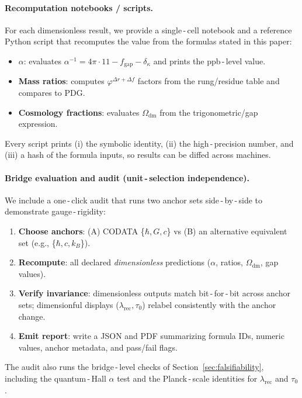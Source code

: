\documentclass[11pt]{article}
\newcommand{\lamrec}{\lambda_{\mathrm{rec}}}
\newcommand{\tauzero}{\tau_{0}}
\theoremstyle{remark}
\begin{document}
\paragraph{Recomputation notebooks / scripts.}
For each dimensionless result, we provide a single\,\mbox{-}\,cell notebook and a reference Python script that recomputes the value from the formulas stated in this paper:
\begin{itemize}
  \item \textbf{$\alpha$}: evaluates $\alpha^{-1}=4\pi\cdot 11 - f_{\mathrm{gap}} - \delta_{\kappa}$ and prints the ppb\,\mbox{-}\,level value.
  \item \textbf{Mass ratios}: computes $\varphi^{\Delta r + \Delta f}$ factors from the rung/residue table and compares to PDG.
  \item \textbf{Cosmology fractions}: evaluates $\Omega_{\mathrm{dm}}$ from the trigonometric/gap expression.
\end{itemize}
Every script prints (i) the symbolic identity, (ii) the high\,\mbox{-}\,precision number, and (iii) a hash of the formula inputs, so results can be diffed across machines.

\paragraph{Bridge evaluation and audit (unit\,\mbox{-}\,selection independence).}
We include a one\,\mbox{-}\,click audit that runs two anchor sets side\,\mbox{-}\,by\,\mbox{-}\,side to demonstrate gauge\,\mbox{-}\,rigidity:
\begin{enumerate}
  \item \textbf{Choose anchors}: \;(A) CODATA\,\,\{$\hbar, G, c$\} vs (B) an alternative equivalent set (e.g., \{$\hbar, c, k_{B}$\}).
  \item \textbf{Recompute}: \;all declared \emph{dimensionless} predictions ($\alpha$, ratios, $\Omega_{\mathrm{dm}}$, gap values).
  \item \textbf{Verify invariance}: \;dimensionless outputs match bit\,\mbox{-}\,for\,\mbox{-}\,bit across anchor sets; dimensionful displays (\(\lamrec, \tauzero\)) relabel consistently with the anchor change.
  \item \textbf{Emit report}: \;write a JSON and PDF summarizing formula IDs, numeric values, anchor metadata, and pass/fail flags.
\end{enumerate}
The audit also runs the bridge\,\mbox{-}\,level checks of Section~\ref{sec:falsifiability}, including the quantum\,\mbox{-}\,Hall $\alpha$ test and the Planck\,\mbox{-}\,scale identities for $\lamrec$ and $\tauzero$.
\end{document}

